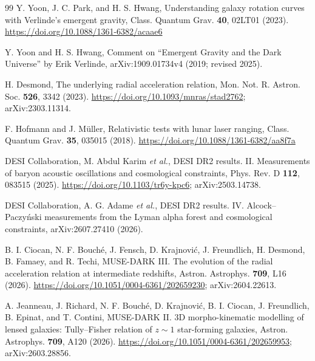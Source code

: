 \documentclass[aps,prd,twocolumn,superscriptaddress,nofootinbib,showkeys]{revtex4-2}
\begin{document}
\begin{thebibliography}{99}
 Y. Yoon, J. C. Park, and H. S. Hwang, Understanding galaxy rotation curves with Verlinde's emergent gravity, Class. Quantum Grav. \textbf{40}, 02LT01 (2023). \url{https://doi.org/10.1088/1361-6382/acaae6}

 Y. Yoon and H. S. Hwang, Comment on ``Emergent Gravity and the Dark Universe'' by Erik Verlinde, arXiv:1909.01734v4 (2019; revised 2025).

 H. Desmond, The underlying radial acceleration relation, Mon. Not. R. Astron. Soc. \textbf{526}, 3342 (2023). \url{https://doi.org/10.1093/mnras/stad2762}; arXiv:2303.11314.

 F. Hofmann and J. M\"uller, Relativistic tests with lunar laser ranging, Class. Quantum Grav. \textbf{35}, 035015 (2018). \url{https://doi.org/10.1088/1361-6382/aa8f7a}

 DESI Collaboration, M. Abdul Karim \emph{et al.}, DESI DR2 results. II. Measurements of baryon acoustic oscillations and cosmological constraints, Phys. Rev. D \textbf{112}, 083515 (2025). \url{https://doi.org/10.1103/tr6y-kpc6}; arXiv:2503.14738.

 DESI Collaboration, A. G. Adame \emph{et al.}, DESI DR2 results. IV. Alcock--Paczy\'nski measurements from the Lyman alpha forest and cosmological constraints, arXiv:2607.27410 (2026).

 B. I. Ciocan, N. F. Bouch\'e, J. Fensch, D. Krajnovi\'c, J. Freundlich, H. Desmond, B. Famaey, and R. Techi, MUSE-DARK III. The evolution of the radial acceleration relation at intermediate redshifts, Astron. Astrophys. \textbf{709}, L16 (2026). \url{https://doi.org/10.1051/0004-6361/202659230}; arXiv:2604.22613.

 A. Jeanneau, J. Richard, N. F. Bouch\'e, D. Krajnovi\'c, B. I. Ciocan, J. Freundlich, B. Epinat, and T. Contini, MUSE-DARK II. 3D morpho-kinematic modelling of lensed galaxies: Tully--Fisher relation of $z\sim1$ star-forming galaxies, Astron. Astrophys. \textbf{709}, A120 (2026). \url{https://doi.org/10.1051/0004-6361/202659953}; arXiv:2603.28856.

\end{thebibliography}
\end{document}
